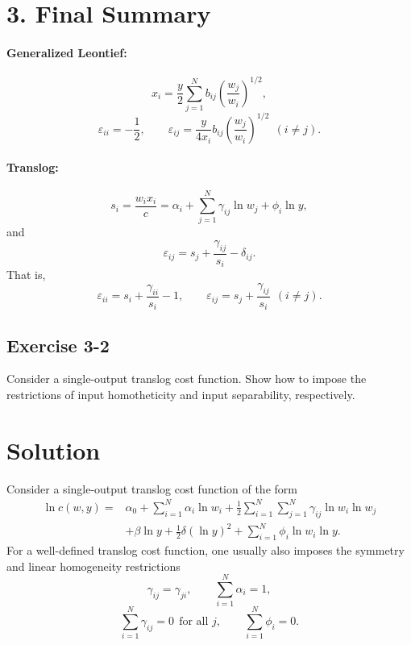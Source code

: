 \bigskip
\section*{3. Final Summary}

\paragraph{Generalized Leontief:}
\[
x_i
=
\frac{y}{2}\sum_{j=1}^N b_{ij}\left(\frac{w_j}{w_i}\right)^{1/2},
\]
\[
\boxed{
\varepsilon_{ii}=-\frac{1}{2},
\qquad
\varepsilon_{ij}
=
\frac{y}{4x_i}b_{ij}\left(\frac{w_j}{w_i}\right)^{1/2}
\ \ (i\neq j).
}
\]

\paragraph{Translog:}
\[
s_i=\frac{w_i x_i}{c}
=
\alpha_i+\sum_{j=1}^N \gamma_{ij}\ln w_j+\phi_i\ln y,
\]
and
\[
\boxed{
\varepsilon_{ij}
=
s_j+\frac{\gamma_{ij}}{s_i}-\delta_{ij}.
}
\]
That is,
\[
\boxed{
\varepsilon_{ii}
=
s_i+\frac{\gamma_{ii}}{s_i}-1,
\qquad
\varepsilon_{ij}
=
s_j+\frac{\gamma_{ij}}{s_i}
\ \ (i\neq j).
}
\]


\vspace{30pt}
\begin{tcolorbox}[breakable]

\subsection*{Exercise 3-2}

Consider a single-output translog cost function.
Show how to impose the restrictions of input homotheticity and input separability,
respectively.

\end{tcolorbox}


\section*{Solution}

Consider a single-output translog cost function of the form
\[
\begin{aligned}
\ln c(w,y)
=
&\alpha_0
+
\sum_{i=1}^N \alpha_i \ln w_i
+
\frac{1}{2}\sum_{i=1}^N \sum_{j=1}^N \gamma_{ij}\ln w_i \ln w_j\\
&+
\beta \ln y
+
\frac{1}{2}\delta (\ln y)^2
+
\sum_{i=1}^N \phi_i \ln w_i \ln y.
\end{aligned}
\]
For a well-defined translog cost function, one usually also imposes the symmetry and linear homogeneity restrictions
\[
\gamma_{ij}=\gamma_{ji},
\qquad
\sum_{i=1}^N \alpha_i=1,
\]
\[
\sum_{i=1}^N \gamma_{ij}=0 \ \ \text{for all } j,
\qquad
\sum_{i=1}^N \phi_i=0.
\]


